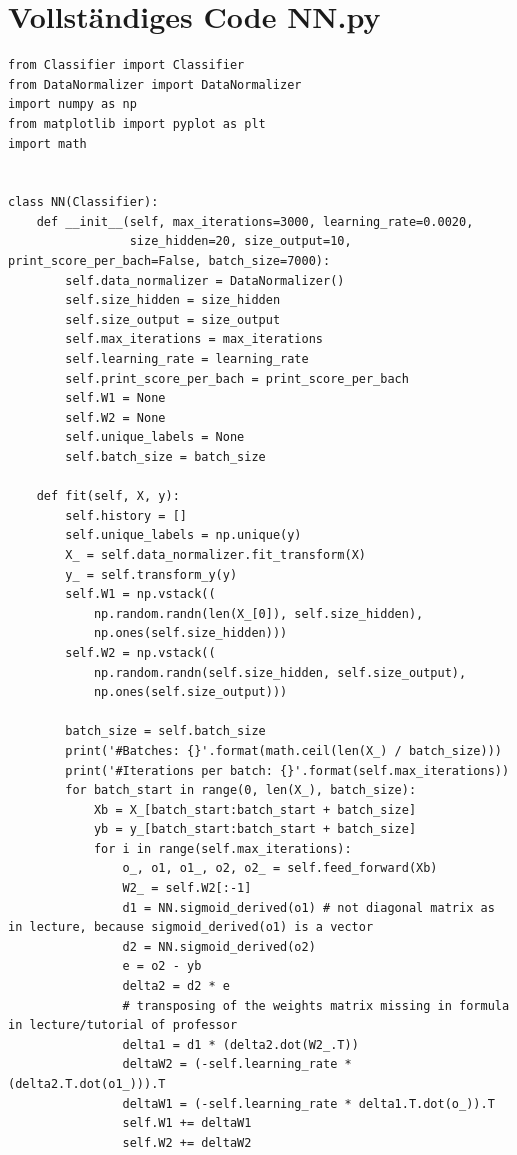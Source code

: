 \section*{Vollständiges Code NN.py}

\begin{lstlisting}[style=py]
from Classifier import Classifier
from DataNormalizer import DataNormalizer
import numpy as np
from matplotlib import pyplot as plt
import math


class NN(Classifier):
    def __init__(self, max_iterations=3000, learning_rate=0.0020,
                 size_hidden=20, size_output=10, print_score_per_bach=False, batch_size=7000):
        self.data_normalizer = DataNormalizer()
        self.size_hidden = size_hidden
        self.size_output = size_output
        self.max_iterations = max_iterations
        self.learning_rate = learning_rate
        self.print_score_per_bach = print_score_per_bach
        self.W1 = None
        self.W2 = None
        self.unique_labels = None
        self.batch_size = batch_size

    def fit(self, X, y):
        self.history = []
        self.unique_labels = np.unique(y)
        X_ = self.data_normalizer.fit_transform(X)
        y_ = self.transform_y(y)
        self.W1 = np.vstack((
            np.random.randn(len(X_[0]), self.size_hidden),
            np.ones(self.size_hidden)))
        self.W2 = np.vstack((
            np.random.randn(self.size_hidden, self.size_output),
            np.ones(self.size_output)))

        batch_size = self.batch_size
        print('#Batches: {}'.format(math.ceil(len(X_) / batch_size)))
        print('#Iterations per batch: {}'.format(self.max_iterations))
        for batch_start in range(0, len(X_), batch_size):
            Xb = X_[batch_start:batch_start + batch_size]
            yb = y_[batch_start:batch_start + batch_size]
            for i in range(self.max_iterations):
                o_, o1, o1_, o2, o2_ = self.feed_forward(Xb)
                W2_ = self.W2[:-1]
                d1 = NN.sigmoid_derived(o1) # not diagonal matrix as in lecture, because sigmoid_derived(o1) is a vector
                d2 = NN.sigmoid_derived(o2)
                e = o2 - yb
                delta2 = d2 * e
                # transposing of the weights matrix missing in formula in lecture/tutorial of professor
                delta1 = d1 * (delta2.dot(W2_.T))
                deltaW2 = (-self.learning_rate * (delta2.T.dot(o1_))).T
                deltaW1 = (-self.learning_rate * delta1.T.dot(o_)).T
                self.W1 += deltaW1
                self.W2 += deltaW2


\end{lstlisting}
